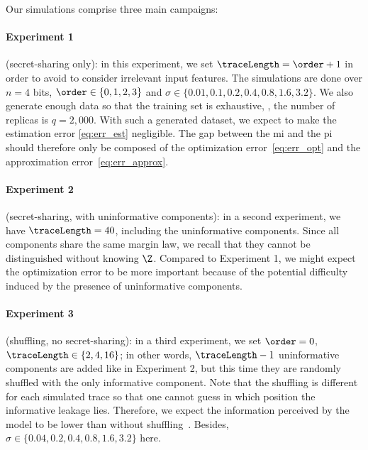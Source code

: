 Our simulations comprise three main campaigns:
\paragraph{Experiment 1} (secret-sharing only): 
    in this experiment, we set \(\traceLength = \order+1\) in order to  avoid to consider irrelevant input features. 
	The simulations are done over \(n = 4\) bits, \(\order \in \{0, 1, 2, 3\}\) and \(\sigma \in \{0.01, 0.1, 0.2, 0.4, 0.8, 1.6, 3.2\}\).
	We also generate enough data so that the training set is exhaustive, \ie{}, the number of replicas is \(q = 2,000\). 
	With such a generated dataset, we expect to make the estimation error \eqref{eq:err_est} negligible.
	The gap between the \gls{mi} and the \gls{pi} should therefore only be composed of the optimization error~\eqref{eq:err_opt} and the approximation error~\eqref{eq:err_approx}.
	
\paragraph{Experiment 2} (secret-sharing, with uninformative components): 
    in a second experiment, we have \(\traceLength = 40\), including the uninformative components. 
	Since all components share the same margin law, we recall that they cannot be distinguished without knowing \(\Z\).
	Compared to Experiment 1, we might expect the optimization error to be more important because of the potential difficulty induced by the presence of uninformative components. 
	
\paragraph{Experiment 3} (shuffling, no secret-sharing):
	in a third experiment, we set \(\order = 0\), \(\traceLength \in \{2, 4, 16\}\); in other words, \(\traceLength - 1\) uninformative components are added like in Experiment 2, but this time they are randomly shuffled with the only informative component.
	Note that the shuffling is different for each simulated trace so that one cannot guess in which position the informative leakage lies.
	Therefore, we expect the information perceived by the model to be lower than without shuffling~\cite{veyrat-charvillon_shuffling_2012}.
	Besides, \(\sigma \in \{0.04, 0.2, 0.4, 0.8, 1.6, 3.2\}\) here.



